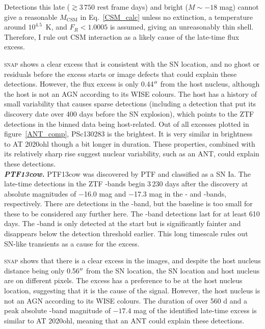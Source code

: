 \documentclass[a4paper,oneside,12pt, class=Latex/Classes/PhDthesisPSnPDF, crop=false]{standalone}
\begin{document}
Detections this late ($\gtrsim 3\,750$ rest frame days) and bright ($M \sim -18$ mag) cannot give a reasonable $M_\text{CSM}$ in Eq.~\ref{CSM_calc} unless no extinction, a temperature around $10^{4.5}$~K, and $F_R < 1.0005$ is assumed, giving an unreasonably thin shell. Therefore, I rule out CSM interaction as a likely cause of the late-time flux excess.

\textsc{snap} shows a clear excess that is consistent with the SN location, and no ghost or residuals before the excess starts or image defects that could explain these detections. However, the flux excess is only 0.44$^{\prime\prime}$ from the host nucleus, although the host is not an AGN according to its WISE colours. The host has a history of small variability that causes sparse detections (including a detection that put its discovery date over 400 days before the SN explosion), which points to the ZTF detections in the binned data being host-related. Out of all excesses plotted in figure~\ref{ANT_comp}, PSc130283 is the brightest. It is very similar in brightness to AT 2020ohl though a bit longer in duration. These properties, combined with its relatively sharp rise suggest nuclear variability, such as an ANT, could explain these detections.\\


\textit{\textbf{PTF13cow.}}
PTF13cow was discovered by PTF and classified as a SN Ia. The late-time detections in the ZTF \ztfg\ztfr\ztfi-bands begin 3\,230 days after the discovery at absolute magnitudes of $-$16.0 mag and $-$17.3 mag in the \ztfg- and \ztfr-bands, respectively. There are detections in the \ztfi-band, but the baseline is too small for these to be considered any further here. The \ztfr-band detections last for at least 610 days. The \ztfg-band is only detected at the start but is significantly fainter and disappears below the detection threshold earlier. This long timescale rules out SN-like transients as a cause for the excess.

\textsc{snap} shows that there is a clear excess in the images, and despite the host nucleus distance being only 0.56$^{\prime\prime}$ from the SN location, the SN location and host nucleus are on different pixels. The excess has a preference to be at the host nucleus location, suggesting that it is the cause of the signal. However, the host nucleus is not an AGN according to its WISE colours. The duration of over 560 d and a peak absolute \ztfr-band magnitude of $-17.4$ mag of the identified late-time excess is similar to AT 2020ohl, meaning that an ANT could explain these detections.\\ \\ \\
\end{document}
